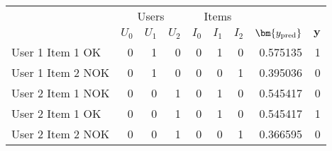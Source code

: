 \begin{tabular}{lrrrrrrrr}
\toprule
& \multicolumn{3}{c}{Users} & \multicolumn{3}{c}{Items}\\
\cmidrule{2-4} \cmidrule{5-7}
{} &  $U_0$ &  $U_1$ &  $U_2$ &  $I_0$ &  $I_1$ &  $I_2$ &    $\bm{y_\textnormal{pred}}$ &  $\bm{y}$ \\
\midrule
User 1 Item 1 OK  &  0 &  1 &  0 &  0 &  1 &  0 &  0.575135 &      1 \\
User 1 Item 2 NOK &  0 &  1 &  0 &  0 &  0 &  1 &  0.395036 &      0 \\
User 2 Item 1 \alert{NOK} &  0 &  0 &  1 &  0 &  1 &  0 &  \alert{0.545417} &      \alert0 \\
User 2 Item 1 \alert{OK}  &  0 &  0 &  1 &  0 &  1 &  0 &  \alert{0.545417} &      \alert1 \\
User 2 Item 2 NOK &  0 &  0 &  1 &  0 &  0 &  1 &  0.366595 &      0 \\
\bottomrule
\end{tabular}
